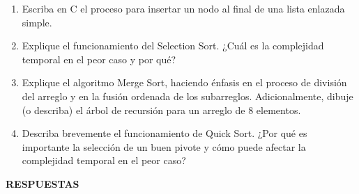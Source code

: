 \documentclass[12pt]{article}
\begin{document}
\begin{titlepage}
\begin{enumerate}
            \item Escriba en C el proceso para insertar un nodo al final de una lista enlazada simple. 
            
            \item Explique el funcionamiento del Selection Sort. ¿Cuál es la complejidad temporal en el peor caso y por qué?
        
            \item Explique el algoritmo Merge Sort, haciendo énfasis en el proceso de división del arreglo y en la fusión ordenada de los subarreglos. Adicionalmente, dibuje (o describa) el árbol de recursión para un arreglo de 8 elementos.
            
            \item Describa brevemente el funcionamiento de Quick Sort. ¿Por qué es importante la selección de un buen pivote y cómo puede afectar la complejidad temporal en el peor caso?
        \end{enumerate}
    \end{titlepage}

    \newpage
        \begin{center}
            \textbf{RESPUESTAS}
        \end{center}
\end{document}
